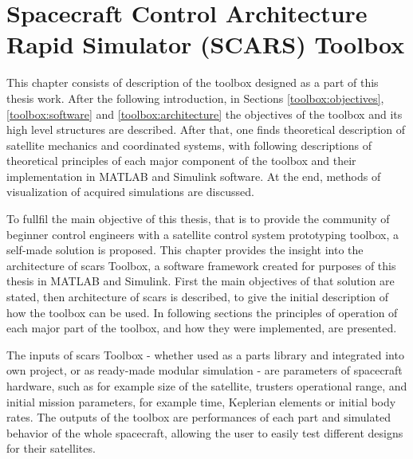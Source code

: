 \section{Spacecraft Control Architecture Rapid Simulator (SCARS) Toolbox}\label{sec:toolbox}
    This chapter consists of description of the toolbox designed as a part of this thesis work. After the following introduction, in Sections \ref{toolbox:objectives}, \ref{toolbox:software} and \ref{toolbox:architecture} the objectives of the toolbox and its high level structures are described. After that, one finds theoretical description of satellite mechanics and coordinated systems, with following descriptions of theoretical principles of each major component of the toolbox and their implementation in MATLAB and Simulink software. At the end, methods of visualization of acquired simulations are discussed.  

    To fullfil the main objective of this thesis, that is to provide the community of beginner control engineers with a satellite control system prototyping toolbox, a self-made solution is proposed. This chapter provides the insight into the architecture of \ac*{scars} Toolbox, a software framework created for purposes of this thesis in MATLAB and Simulink. First the main objectives of that solution are stated, then architecture of \ac{scars} is described, to give the initial description of how the toolbox can be used. In following sections the principles of operation of each major part of the toolbox, and how they were implemented, are presented.

    The inputs of \ac{scars} Toolbox - whether used as a parts library and integrated into own project, or as ready-made modular simulation - are parameters of spacecraft hardware, such as for example size of the satellite, trusters operational range, and initial mission parameters, for example time, Keplerian elements or initial body rates. The outputs of the toolbox are performances of each part and simulated behavior of the whole spacecraft, allowing the user to easily test different designs for their satellites.

